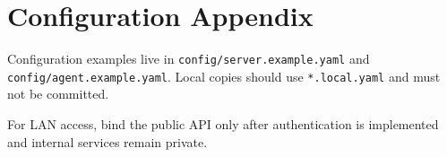 \section{Configuration Appendix}

Configuration examples live in \texttt{config/server.example.yaml} and \texttt{config/agent.example.yaml}. Local copies should use \texttt{*.local.yaml} and must not be committed.

For LAN access, bind the public API only after authentication is implemented and internal services remain private.
